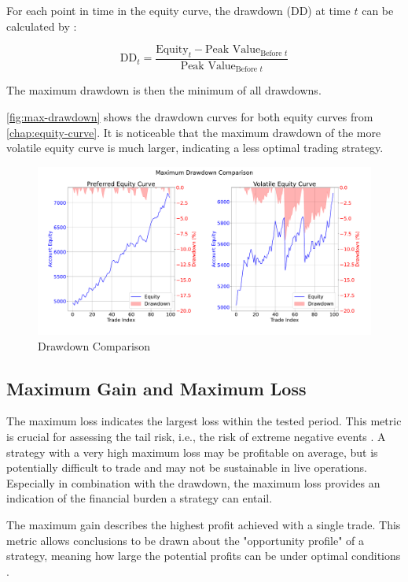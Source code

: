 For each point in time in the equity curve, the drawdown (DD) at time $t$ can be calculated by \cite{dd}:

\[
    \text{DD}_t = \frac{\text{Equity}_t - \text{Peak Value}_{\text{Before }t}}{\text{Peak Value}_{\text{Before }t}}

\]

\noindent
The maximum drawdown is then the minimum of all drawdowns.

\autoref{fig:max-drawdown} shows the drawdown curves for both equity curves from \autoref{chap:equity-curve}.
It is noticeable that the maximum drawdown of the more volatile equity curve is much larger, indicating a less optimal trading strategy.

\begin{figure}[H]
    \centering
    \includegraphics[width=\textwidth]{images/trading-strategies/max-drawdown}
    \caption{Drawdown Comparison}
    \label{fig:max-drawdown}
\end{figure}

\subsection{Maximum Gain and Maximum Loss}

The maximum loss indicates the largest loss within the tested period.
This metric is crucial for assessing the tail risk, i.e., the risk of extreme negative events \cite{max-loss}.
A strategy with a very high maximum loss may be profitable on average, but is potentially difficult to trade and may not be sustainable in live operations.
Especially in combination with the drawdown, the maximum loss provides an indication of the financial burden a strategy can entail.

The maximum gain describes the highest profit achieved with a single trade.
This metric allows conclusions to be drawn about the "opportunity profile" of a strategy, meaning how large the potential profits can be under optimal conditions \cite{max-gain}.

